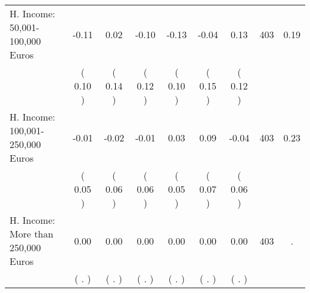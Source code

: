 \begin{tabular}{lcccccccc}
H. Income: 50,001-100,000 Euros &     -0.11 &      0.02 &     -0.10 &     -0.13 &     -0.04 &      0.13 & 403 &       0.19 \\ 
 & (     0.10 ) & (     0.14 ) & (     0.12 ) & (     0.10 ) & (     0.15 ) & (     0.12 ) & \\
H. Income: 100,001-250,000 Euros &     -0.01 &     -0.02 &     -0.01 &      0.03 &      0.09 &     -0.04 & 403 &       0.23 \\ 
 & (     0.05 ) & (     0.06 ) & (     0.06 ) & (     0.05 ) & (     0.07 ) & (     0.06 ) & \\
H. Income: More than 250,000 Euros &      0.00 &      0.00 &      0.00 &      0.00 &      0.00 &      0.00 & 403 &          . \\ 
 & (        . ) & (        . ) & (        . ) & (        . ) & (        . ) & (        . ) & \\
\bottomrule
\end{tabular}
